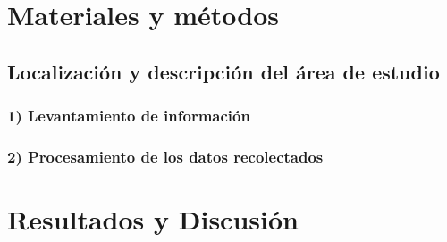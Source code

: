 \documentclass[letterpaper,9pt,twocolumn,twoside,]{pinp}
\begin{document}
\hypertarget{materiales-y-muxe9todos}{%
\section{Materiales y métodos}\label{materiales-y-muxe9todos}}

\hypertarget{localizaciuxf3n-y-descripciuxf3n-del-uxe1rea-de-estudio}{%
\subsection{Localización y descripción del área de
estudio}\label{localizaciuxf3n-y-descripciuxf3n-del-uxe1rea-de-estudio}}

\hypertarget{levantamiento-de-informaciuxf3n}{%
\subsubsection{1) Levantamiento de
información}\label{levantamiento-de-informaciuxf3n}}

\hypertarget{procesamiento-de-los-datos-recolectados}{%
\subsubsection{2) Procesamiento de los datos
recolectados}\label{procesamiento-de-los-datos-recolectados}}

\hypertarget{resultados-y-discusiuxf3n}{%
\section{Resultados y Discusión}\label{resultados-y-discusiuxf3n}}



\renewcommand\refname{Conclusiones}


\end{document}

